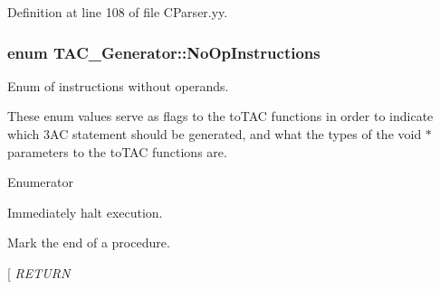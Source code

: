 Definition at line 108 of file C\-Parser.\-yy.

\hypertarget{classTAC__Generator_a3942f3e280fb83e44ad85eb13d56dfb5}{
\subsubsection[{No\-Op\-Instructions}]{\setlength{\rightskip}{0pt plus 5cm}enum {\bf T\-A\-C\-\_\-\-Generator\-::\-No\-Op\-Instructions}}}\label{classTAC__Generator_a3942f3e280fb83e44ad85eb13d56dfb5}


Enum of instructions without operands. 

These enum values serve as flags to the to\-T\-A\-C functions in order to indicate which 3\-A\-C statement should be generated, and what the types of the void $\ast$ parameters to the to\-T\-A\-C functions are. \begin{Desc}
\item[Enumerator]\par
\begin{description}
\item[{\em 
\hypertarget{classTAC__Generator_a3942f3e280fb83e44ad85eb13d56dfb5a8e16b137fe321cada85cb3ab596934f7}{H\-A\-L\-T}\label{classTAC__Generator_a3942f3e280fb83e44ad85eb13d56dfb5a8e16b137fe321cada85cb3ab596934f7}
}]Immediately halt execution. \item[{\em 
\hypertarget{classTAC__Generator_a3942f3e280fb83e44ad85eb13d56dfb5ab8cc9678456e68db56838ba762eb03cf}{E\-N\-D\-P\-R\-O\-C}\label{classTAC__Generator_a3942f3e280fb83e44ad85eb13d56dfb5ab8cc9678456e68db56838ba762eb03cf}
}]Mark the end of a procedure. \item[{\em 
\hypertarget{classTAC__Generator_a3942f3e280fb83e44ad85eb13d56dfb5a0e868fa94bac0750a62dfa98d0f56510}{R\-E\-T\-U\-R\-N}\label{classTAC__Generator_a3942f3e280fb83e44ad85eb13d56dfb5a0e868fa94bac0750a62dfa98d0f56510}
}
\end{description}
\end{Desc}
